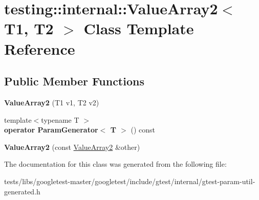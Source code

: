 \hypertarget{classtesting_1_1internal_1_1ValueArray2}{}\section{testing\+:\+:internal\+:\+:Value\+Array2$<$ T1, T2 $>$ Class Template Reference}
\label{classtesting_1_1internal_1_1ValueArray2}
\subsection*{Public Member Functions}
\begin{DoxyCompactItemize}
\item 
\mbox{\label{classtesting_1_1internal_1_1ValueArray2_af641714b9a06929e4dcabe8854d0da1c}} 
{\bfseries Value\+Array2} (T1 v1, T2 v2)
\item 
\mbox{\label{classtesting_1_1internal_1_1ValueArray2_aa81899f10bfd345c17aae540acc296a9}} 
{\footnotesize template$<$typename T $>$ }\\{\bfseries operator Param\+Generator$<$ T $>$} () const
\item 
\mbox{\label{classtesting_1_1internal_1_1ValueArray2_ac0da580bf4f38494da741c7140a7927d}} 
{\bfseries Value\+Array2} (const \hyperlink{classtesting_1_1internal_1_1ValueArray2}{Value\+Array2} \&other)
\end{DoxyCompactItemize}


The documentation for this class was generated from the following file\+:\begin{DoxyCompactItemize}
\item 
tests/libs/googletest-\/master/googletest/include/gtest/internal/gtest-\/param-\/util-\/generated.\+h\end{DoxyCompactItemize}
